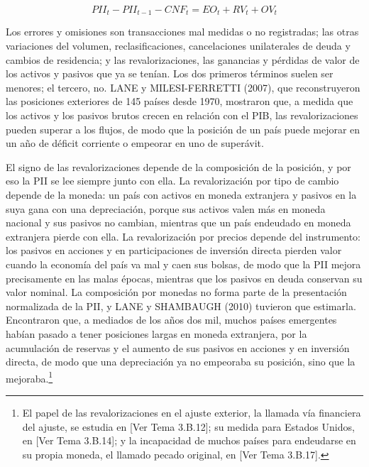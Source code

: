\documentclass[10pt,a4paper]{article}
\newcommand{\authorfont}[1]{{\fontfamily{EBGaramond-TLF}\selectfont #1}}
\begin{document}
$$PII_t-PII_{t-1}-CNF_t=EO_t+RV_t+OV_t$$

Los errores y omisiones son transacciones mal medidas o no registradas; las otras variaciones del volumen, reclasificaciones, cancelaciones unilaterales de deuda y cambios de residencia; y las revalorizaciones, las ganancias y pérdidas de valor de los activos y pasivos que ya se tenían. Los dos primeros términos suelen ser menores; el tercero, no. LANE y MILESI-FERRETTI (2007), que reconstruyeron las posiciones exteriores de 145 países desde 1970, mostraron que, a medida que los activos y los pasivos brutos crecen en relación con el PIB, las revalorizaciones pueden superar a los flujos, de modo que la posición de un país puede mejorar en un año de déficit corriente o empeorar en uno de superávit.

El signo de las revalorizaciones depende de la composición de la posición, y por eso la PII se lee siempre junto con ella. La revalorización por tipo de cambio depende de la moneda: un país con activos en moneda extranjera y pasivos en la suya gana con una depreciación, porque sus activos valen más en moneda nacional y sus pasivos no cambian, mientras que un país endeudado en moneda extranjera pierde con ella. La revalorización por precios depende del instrumento: los pasivos en acciones y en participaciones de inversión directa pierden valor cuando la economía del país va mal y caen sus bolsas, de modo que la PII mejora precisamente en las malas épocas, mientras que los pasivos en deuda conservan su valor nominal. La composición por monedas no forma parte de la presentación normalizada de la PII, y LANE y SHAMBAUGH (2010) tuvieron que estimarla. Encontraron que, a mediados de los años dos mil, muchos países emergentes habían pasado a tener posiciones largas en moneda extranjera, por la acumulación de reservas y el aumento de sus pasivos en acciones y en inversión directa, de modo que una depreciación ya no empeoraba su posición, sino que la mejoraba.\footnote{%
    El papel de las revalorizaciones en el ajuste exterior, la llamada vía financiera del ajuste, se estudia en [\authorfont{Ver Tema 3.B.12}]; su medida para Estados Unidos, en [\authorfont{Ver Tema 3.B.14}]; y la incapacidad de muchos países para endeudarse en su propia moneda, el llamado pecado original, en [\authorfont{Ver Tema 3.B.17}].
}
\end{document}
